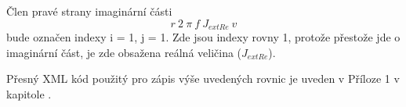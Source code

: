 \documentclass[12pt,a4paper,oneside]{article}
\numberwithin{equation}{section} %
\numberwithin{figure}{section} %
\numberwithin{table}{section} %
\newcommand{\mj}{\mathrm{j}} %
\newcommand{\faz}[1]{{\underline{#1}}} %
\newcommand{\rot}{\mathrm{rot}\ }
\newcommand\numberthis{\addtocounter{equation}{1}\tag{\theequation}}
\begin{document}
Člen pravé strany imaginární části
\begin{equation}
r ~ 2 ~ \pi ~ f ~ J _{extRe} ~ v
\end{equation}
bude označen indexy i = 1, j = 1. Zde jsou indexy rovny 1, protože přestože jde o imaginární část, je zde obsažena reálná veličina ($J _{extRe}$).

Přesný XML kód použitý pro zápis výše uvedených rovnic je uveden v Příloze 1 v kapitole .

\end{document}
